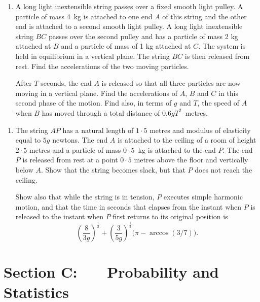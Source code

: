 \documentclass[a4, 11pt]{report}
\newlength{\qspace}
\newcounter{qnumber}
\newenvironment{question}%
 {\vspace{\qspace}
  \begin{enumerate}[\bfseries 1\quad][10]%
    \setcounter{enumi}{\value{qnumber}}%
    \item%
 }
{
  \end{enumerate}
  \filbreak
  \stepcounter{qnumber}
 }
\begin{document}
\begin{question}	
A long light 
inextensible string passes over a fixed smooth light pulley.
 A particle of mass 4~kg is attached to one end $A$ of this string
and the 
other end is attached to a second smooth light pulley.
A long light inextensible string $BC$ passes over the second pulley
and has a particle 
of mass 2 kg attached at $B$ and a particle of
mass of 1 kg  attached at $C$.  The
system is held in equilibrium in a vertical plane. 
The  string $BC$ is then released from rest.
Find the accelerations of the two moving particles.

After $T$ seconds, the end $A$ is released so that all three particles
are now moving in a vertical plane.
Find the accelerations of $A$, $B$ and $C$ in this second phase of
the motion.
Find also, in terms of $g$ and $T$, the speed of $A$ when $B$ has
moved through a total distance of $0.6gT^{2}$~metres. 
\end{question}


\begin{question}
The string $AP$ has a natural length of $1\!\cdot5\!$ metres and modulus of
elasticity equal to $5g$ newtons. The end $A$
is attached to the ceiling of a room of height $2\!\cdot\!5$ metres and 
a particle of mass \mbox{$0\!\cdot\!5$ kg}
is attached to the end $P$.  The  end  $P$  is 
released from  rest at a point $0\!\cdot\!5$ metres above the floor and vertically
below $A$.  Show that the string becomes slack, but that $P$ does not
reach the ceiling.

Show also that while the string is in tension, $P$ executes simple 
harmonic motion,
and that the time in seconds that elapses from the instant when $P$ is released
to the instant when $P$ first returns to its original position is
$$
\left(\frac8{3g}\right)^{\!\frac12}+
\left(\frac3 {5g}\right)^{\!\frac12}
{\Big(\pi - \arccos (3/7)\Big)}.
$$  

\end{question}
	

	
	\newpage
\section*{Section C: \ \ \ Probability and Statistics}
\end{document}
